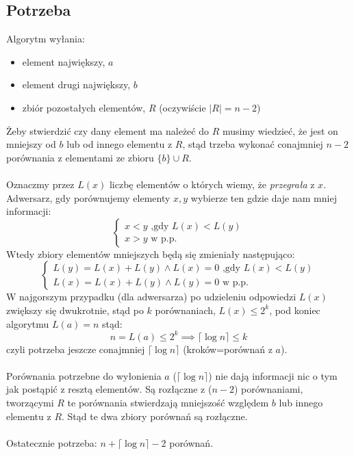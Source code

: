 \documentclass{article}
\begin{document}
\subsection*{Potrzeba}
Algorytm wyłania:
\begin{itemize}
    \item element największy, $a$
    \item element drugi największy, $b$
    \item zbiór pozostałych elementów, $R$ (oczywiście $|R|=n-2$)
\end{itemize}
Żeby stwierdzić czy dany element ma należeć do $R$ musimy wiedzieć, że jest on mniejszy od $b$ lub od innego elementu z $R$, stąd trzeba wykonać conajmniej $n-2$ porównania z elementami ze zbioru $\{b\} \cup R$.\\\\
Oznaczmy przez $L(x)$ liczbę elementów o których wiemy, że \textit{przegrała} z $x$.\\
Adwersarz, gdy porównujemy elementy $x,y$ wybierze ten gdzie daje nam mniej informacji:
$$
\begin{cases}
x<y \text{   ,gdy   } L(x) < L(y)\\
x>y \text{    w p.p.}
\end{cases}
$$
Wtedy zbiory elementów mniejszych będą się zmieniały następująco:
$$
\begin{cases}
L(y)=L(x)+L(y) \land L(x) = 0 \text{   ,gdy   } L(x) < L(y)\\
L(x)=L(x)+L(y) \land L(y) = 0 \text{    w p.p.}
\end{cases}
$$
W najgorszym przypadku (dla adwersarza) po udzieleniu odpowiedzi $L(x)$ zwiększy się dwukrotnie, stąd po $k$ porównaniach, $L(x) \leq 2^k$, pod koniec algorytmu $L(a) = n$ stąd:
$$
n = L(a) \leq 2^k \implies \lceil \log{n} \rceil \leq k
$$
czyli potrzeba jeszcze conajmniej $\lceil \log{n} \rceil$ (kroków=porównań z $a$).\\\\
Porównania potrzebne do wyłonienia $a$ ($\lceil{\log{n}}\rceil$) nie dają informacji nic o tym jak postąpić z resztą elementów. Są rozłączne z ($n-2$) porównaniami, tworzącymi $R$ te porównania stwierdzają mniejszość względem $b$ lub innego elementu z $R$.  Stąd te dwa zbiory porównań są rozłączne.\\\\
Ostatecznie potrzeba: $n + \lceil{\log{n}}\rceil - 2$ porównań.
\end{document}
